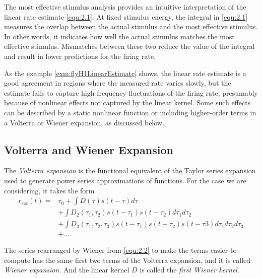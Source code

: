 \begin{rem}
  The most effective stimulus analysis provides an intuitive interpretation of the linear rate estimate \ref{equ:2.1}. At fixed stimulus energy, the integral in \ref{equ:2.1} measures the overlap between the actual stimulus and the most effective stimulus. In other words, it indicates how well the actual stimulus matches the most effective stimulus. Mismatches between these two reduce the value of the integral and result in lower predictions for the firing
rate.
\end{rem}

\begin{rem}
  As the example \ref{exm:flyH1LinearEstimate} shows, the linear rate estimate is a good agreement in regions where the measured rate varies slowly, but the estimate fails to capture high-frequency fluctuations of the firing rate, presumably because of nonlinear effects not captured by the linear kernel. Some such effects can be described by a static nonlinear function or including higher-order terms in a Volterra or Wiener expansion, as discussed below.
\end{rem}

\subsection{ Volterra and Wiener Expansion}
\begin{defn}
  \label{VolterraExpansion}
  The \emph{Volterra expansion} is the functional equivalent of the Taylor series expansion used to generate power series approximations of functions. For the case we are considering, it takes the form
  \begin{equation}
    \label{equ:2.2}
    \begin{aligned}
      r_{est}(t) = &r_0 + \int D(\tau)s(t-\tau)d\tau \\
      &+ \int D_2(\tau_1,\tau_2)s(t-\tau_1)s(t-\tau_2)d\tau_1d\tau_2 \\
      &+ \int D_3(\tau_1,\tau_2,\tau_3)s(t-\tau_1)s(t-\tau_2)s(t-\tau3)d\tau_1d\tau_2d\tau_3 \\
      &+ \dots.
    \end{aligned}
  \end{equation}
\end{defn}

\begin{defn}
  \label{WienerExpansion}
  The series rearranged by Wiener from \ref{equ:2.2} to make the terms easier to compute has the same first two terms of the Volterra expansion, and it is called \emph{Wiener expansion}.
  And the linear kernel $D$ is called the \emph{first Wiener kernel}.
\end{defn}

